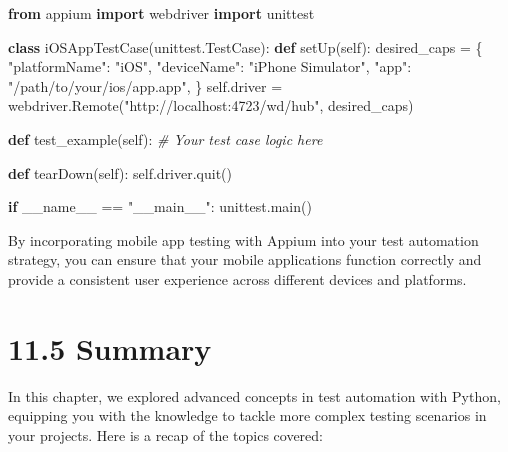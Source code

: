 \documentclass[
  paper=a4,
  ,captions=tableheading
]{scrartcl}
\newenvironment{Shaded}{}{}
\newcommand{\CommentTok}[1]{\textcolor[rgb]{0.38,0.63,0.69}{\textit{#1}}}
\newcommand{\ControlFlowTok}[1]{\textcolor[rgb]{0.00,0.44,0.13}{\textbf{#1}}}
\newcommand{\ImportTok}[1]{\textcolor[rgb]{0.00,0.50,0.00}{\textbf{#1}}}
\newcommand{\KeywordTok}[1]{\textcolor[rgb]{0.00,0.44,0.13}{\textbf{#1}}}
\newcommand{\NormalTok}[1]{#1}
\newcommand{\OperatorTok}[1]{\textcolor[rgb]{0.40,0.40,0.40}{#1}}
\newcommand{\StringTok}[1]{\textcolor[rgb]{0.25,0.44,0.63}{#1}}
\newcommand{\VariableTok}[1]{\textcolor[rgb]{0.10,0.09,0.49}{#1}}
\begin{document}
\begin{Shaded}
\begin{Highlighting}[]

\ImportTok{from}\NormalTok{ appium }\ImportTok{import}\NormalTok{ webdriver}
\ImportTok{import}\NormalTok{ unittest}

\KeywordTok{class}\NormalTok{ iOSAppTestCase(unittest.TestCase):}
    \KeywordTok{def}\NormalTok{ setUp(}\VariableTok{self}\NormalTok{):}
\NormalTok{        desired\_caps }\OperatorTok{=}\NormalTok{ \{}
            \StringTok{"platformName"}\NormalTok{: }\StringTok{"iOS"}\NormalTok{,}
            \StringTok{"deviceName"}\NormalTok{: }\StringTok{"iPhone Simulator"}\NormalTok{,}
            \StringTok{"app"}\NormalTok{: }\StringTok{"/path/to/your/ios/app.app"}\NormalTok{,}
\NormalTok{        \}}
        \VariableTok{self}\NormalTok{.driver }\OperatorTok{=}\NormalTok{ webdriver.Remote(}\StringTok{"http://localhost:4723/wd/hub"}\NormalTok{, desired\_caps)}

    \KeywordTok{def}\NormalTok{ test\_example(}\VariableTok{self}\NormalTok{):}
        \CommentTok{\# Your test case logic here}

    \KeywordTok{def}\NormalTok{ tearDown(}\VariableTok{self}\NormalTok{):}
        \VariableTok{self}\NormalTok{.driver.quit()}

\ControlFlowTok{if} \VariableTok{\_\_name\_\_} \OperatorTok{==} \StringTok{"\_\_main\_\_"}\NormalTok{:}
\NormalTok{    unittest.main()}
\end{Highlighting}
\end{Shaded}

By incorporating mobile app testing with Appium into your test
automation strategy, you can ensure that your mobile applications
function correctly and provide a consistent user experience across
different devices and platforms.

\hypertarget{summary-6}{%
\section{11.5 Summary}\label{summary-6}}

In this chapter, we explored advanced concepts in test automation with
Python, equipping you with the knowledge to tackle more complex testing
scenarios in your projects. Here is a recap of the topics covered:
\end{document}

